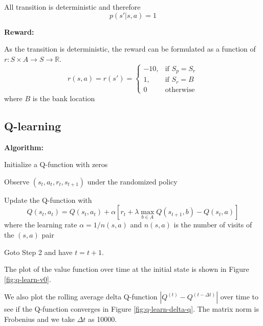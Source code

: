 \documentclass{article}
\begin{document}
All transition is deterministic and therefore
\begin{equation*}
  p(s' | s, a) = 1
\end{equation*}

\textbf{Reward:}

As the transition is deterministic,
the reward can be formulated as a function of $r: S\times A \rightarrow S \rightarrow \mathbb{R}$.
\begin{equation*}
  r(s, a) = r(s') =
\begin{cases}
    -10 ,& \text{if } S_p = S_r\\
    1,   & \text{if } S_r = B\\
    0    & \text{otherwise}
\end{cases}
\end{equation*}
where $B$ is the bank location

\subsection{Q-learning}

\textbf{Algorithm:}
\begin{steps}
  \item Initialize a Q-function with zeros
  \item Observe $(s_t, a_t, r_t, s_{t+1})$ under the randomized policy
  \item Update the Q-function with
  \begin{equation*}
    Q(s_t, a_t) = Q(s_t, a_t) + \alpha [r_t + \lambda\max_{b \in A} Q(s_{t+1}, b) - Q(s_t, a)]
  \end{equation*}
  where the learning rate $\alpha = 1 / n(s, a)$ and $n(s, a)$ is the number of visits
  of the $(s, a)$ pair
  \item Goto Step 2 and have $t = t + 1$.
\end{steps}

The plot of the value function over time at the initial state is shown in Figure
\ref{fig:q-learn-v0}.

We also plot the rolling average delta Q-function $|Q^{(t)} - Q^{(t-\Delta t)}|$ over time
to see if the Q-function converges in Figure \ref{fig:q-learn-delta-q}.
The matrix norm is Frobenius and
we take $\Delta t$ as 10000.
\end{document}
